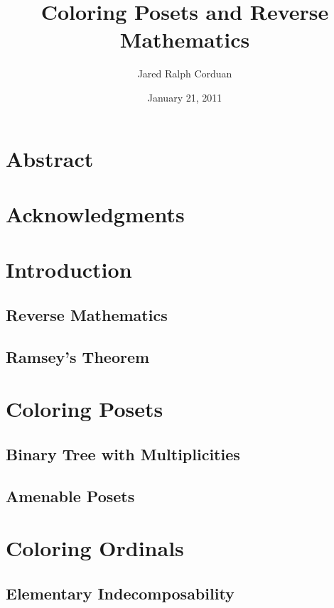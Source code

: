 \documentclass{dcthesis}[]
\title{Coloring Posets and Reverse Mathematics}
\author{Jared Ralph Corduan}
\date{January 21, 2011}
\theoremstyle{definition}
\begin{document}
\frontmatter

\maketitle

\chapter*{Abstract}
	

\chapter*{Acknowledgments}
	

\tableofcontents

\mainmatter

\chapter{Introduction}\label{Intro}
\section{Reverse Mathematics}\label{IntroRevMath}
	
\section{Ramsey's Theorem}\label{IntroRam}
	

\chapter{Coloring Posets}\label{Posets}
	
\section{Binary Tree with Multiplicities}\label{POMult}
	
\section{Amenable Posets}\label{POAmenable}
	

\chapter{Coloring Ordinals}\label{Ords}
	
\section{Elementary Indecomposability}\label{ElemIndec}
	
\end{document}
